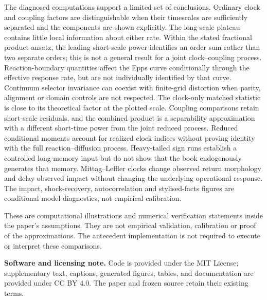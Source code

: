 \documentclass[11pt]{article}
\begin{document}
The diagnosed computations support a limited set of conclusions. Ordinary clock and coupling factors are distinguishable when their timescales are sufficiently separated and the components are shown explicitly. The long-scale plateau contains little local information about either rate. Within the stated fractional product ansatz, the leading short-scale power identifies an order sum rather than two separate orders; this is not a general result for a joint clock--coupling process. Reaction-boundary quantities affect the Epps curve conditionally through the effective response rate, but are not individually identified by that curve. Continuum selector invariance can coexist with finite-grid distortion when parity, alignment or domain controls are not respected. The clock-only matched statistic is close to its theoretical factor at the plotted scale. Coupling comparisons retain short-scale residuals, and the combined product is a separability approximation with a different short-time power from the joint reduced process. Reduced conditional moments account for realized clock indices without proving identity with the full reaction--diffusion process. Heavy-tailed sign runs establish a controlled long-memory input but do not show that the book endogenously generates that memory. Mittag--Leffler clocks change observed return morphology and delay observed impact without changing the underlying operational response. The impact, shock-recovery, autocorrelation and stylised-facts figures are conditional model diagnostics, not empirical calibration.

These are computational illustrations and numerical verification statements inside the paper's assumptions. They are not empirical validation, calibration or proof of the approximations. The antecedent implementation is not required to execute or interpret these comparisons.

\medskip
\noindent\textbf{Software and licensing note.} Code is provided under the MIT License; supplementary text, captions, generated figures, tables, and documentation are provided under CC BY 4.0. The paper and frozen source retain their existing terms.
\end{document}
